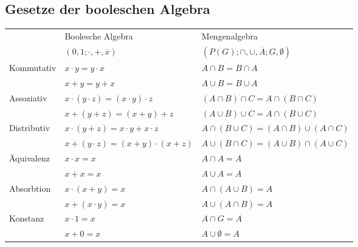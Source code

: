 \documentclass[6pt,a4paper]{scrartcl}
\newcommand{\lighthline}{\noalign{\global\arrayrulewidth=0.005pt}\hline\noalign{\global\arrayrulewidth=0.4pt}}
\begin{document}
\begin{multicols*}{3}
	\subsection{Gesetze der booleschen Algebra}
	\begin{tabular}{l|l|l}
		            & Boolesche Algebra                                     & Mengenalgebra                                         \\
		            & $({0,1};\cdot , +, \overline{x})$                     & $(P(G);\cap , \cup, \overline{A};G,\emptyset )$       \\ \hline
		Kommutativ  & $x \cdot y = y \cdot x$                               & $A \cap B = B \cap A$                                 \\
		            & $x + y = y + x$                                       & $A \cup B = B \cup A$                                 \\ \lighthline
		Assoziativ  & $x \cdot (y \cdot z) = (x \cdot y) \cdot z$           & $(A \cap B) \cap C = A \cap (B \cap C)$               \\
		            & $x + (y + z) = (x + y) + z$                           & $(A \cup B) \cup C = A \cap (B \cup C)$               \\ \lighthline
		Distributiv & $x \cdot (y + z) = x \cdot y + x \cdot z$             & $A \cap (B \cup C) = (A \cap B) \cup (A \cap C)$      \\
		            & $x + (y \cdot z) = (x + y) \cdot (x + z)$             & $A \cup (B \cap C) = (A \cup B) \cap (A \cup C)$      \\ \lighthline
		Äquivalenz & $x \cdot x = x$                                       & $A \cap A = A$                                        \\
		            & $x + x = x$                                           & $A \cup A = A$                                        \\ \lighthline
		Absorbtion  & $x \cdot (x+y) = x$                                   & $A \cap (A \cup B) = A$                               \\
		            & $x + (x \cdot y) = x$                                 & $A \cup (A \cap B) = A$                               \\ \lighthline
		Konstanz     & $x \cdot 1 = x$                                       & $A \cap G = A$                                        \\
		            & $x + 0 = x$                                           & $A \cup \emptyset = A$                                \\

\end{tabular}
\end{multicols*}
\end{document}
